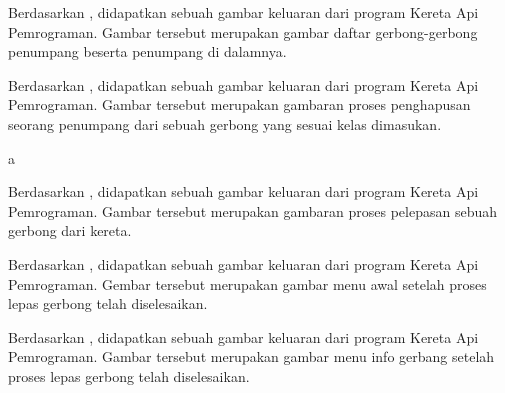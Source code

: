 \documentclass[../main.tex]{subfiles}
\begin{document}
    \begin{indentlevel0}
        \ilz{}Berdasarkan , didapatkan sebuah gambar keluaran dari program Kereta Api Pemrograman. Gambar tersebut merupakan gambar daftar gerbong-gerbong penumpang beserta penumpang di dalamnya.
    \end{indentlevel0}

    \begin{indentlevel0}
        \ilz{}Berdasarkan , didapatkan sebuah gambar keluaran dari program Kereta Api Pemrograman. Gambar tersebut merupakan gambaran proses penghapusan seorang penumpang dari sebuah gerbong yang sesuai kelas dimasukan.
    \end{indentlevel0}

    \newpage
    {\color{white}a\vspace*{-1.5ex}}

    \begin{indentlevel0}
        \ilz{}Berdasarkan , didapatkan sebuah gambar keluaran dari program Kereta Api Pemrograman. Gambar tersebut merupakan gambaran proses pelepasan sebuah gerbong dari kereta.
    \end{indentlevel0}

    \begin{indentlevel0}
        \ilz{}Berdasarkan , didapatkan sebuah gambar keluaran dari program Kereta Api Pemrograman. Gembar tersebut merupakan gambar menu awal setelah proses lepas gerbong telah diselesaikan.
    \end{indentlevel0}

    \begin{indentlevel0}
        \ilz{}Berdasarkan , didapatkan sebuah gambar keluaran dari program Kereta Api Pemrograman. Gambar tersebut merupakan gambar menu info gerbang setelah proses lepas gerbong telah diselesaikan.
    \end{indentlevel0}
\end{document}
